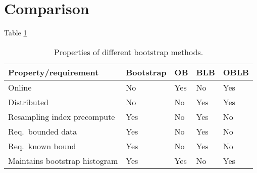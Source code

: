 \documentclass{article}
\begin{document}
\section{Comparison}

Table \ref{bootcomp}

\begin{table}[h]
\caption{Properties of different bootstrap methods.}
\label{bootcomp}
\begin{tabular}{lllll}
\hline
\hline
Property/requirement & Bootstrap & OB & BLB & OBLB \\
\hline
Online & No & Yes & No & Yes \\ 
Distributed & No & No & Yes &  Yes \\ 
Resampling index precompute & Yes & No & Yes & No \\ 
Req.\ bounded data & Yes & No & Yes & No \\ 
Req.\ known bound & Yes & No & Yes & No \\ 
Maintains bootstrap histogram & Yes & Yes & No & Yes \\
\hline
\hline
\end{tabular}
\end{table}




{}

\end{document}

